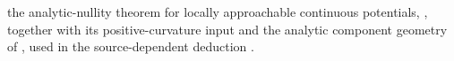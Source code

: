\item the analytic-nullity theorem for locally approachable continuous
  potentials, \cite[Corollary~16.9.4]{CLD25}, together with its
  positive-curvature input \cite[Lemma~8.5.5]{CLD25} and the analytic
  component geometry of \cite[Theorem~4.20]{Ducros09Excellence}, used in
  the source-dependent deduction
  .

